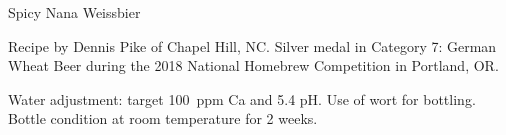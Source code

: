 \documentclass[fontsize=9pt,oneside]{scrbook}
\begin{document}
\mainmatter


\begin{recipe}{Spicy Nana Weissbier}

\begin{aboutblock}
Recipe by Dennis Pike of Chapel Hill, NC. Silver medal in Category 7: German Wheat
Beer during the 2018 National Homebrew Competition in Portland, OR. \sourceaha
\end{aboutblock}


\begin{methodandtiming}
 
\begin{mashsteps}
\end{mashsteps}

\begin{fermentationsteps}
\end{fermentationsteps}

\begin{directions}
Water adjustment: target 100~ppm Ca and 5.4 pH. Use  of wort for
bottling. Bottle condition at room temperature for 2 weeks.
\end{directions}

\end{methodandtiming}

\recipebreak

\begin{ingredientsblock}

\begin{malts}
\end{malts}

\begin{hops}
\end{hops}


\begin{twists}
\end{twists}

\end{ingredientsblock}

\end{recipe}


\end{document}
